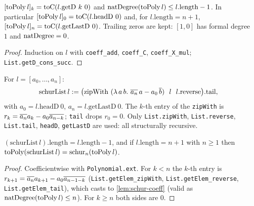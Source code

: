 \begin{lemma}\label{lem:toPoly-coeff}
$\coeff{\mathrm{toPoly}\,l}{k}=\mathrm{toC}(l.\mathrm{getD}\ k\ 0)$ and
$\mathrm{natDegree}(\mathrm{toPoly}\,l)\le l.\mathrm{length}-1$. In particular
$\coeff{\mathrm{toPoly}\,l}0=\mathrm{toC}(l.\mathrm{headD}\ 0)$ and, for
$l.\mathrm{length}=n+1$, $\coeff{\mathrm{toPoly}\,l}n=\mathrm{toC}(l.\mathrm{getLastD}\ 0)$.
Trailing zeros are kept: $[1,0]$ has formal degree $1$ and $\mathrm{natDegree}=0$.
\end{lemma}
\begin{proof}
Induction on $l$ with \texttt{coeff\_add}, \texttt{coeff\_C},
\texttt{coeff\_X\_mul}; \texttt{List.getD\_cons\_succ}.
\end{proof}

\begin{definition}\label{def:schurList}
For $l=[a_0,\ldots,a_n]$:
\[ \mathrm{schurList}\,l := \big(\mathrm{zipWith}\ (\lambda\,a\,b.\ \cj{a_n}\,a-a_0\,\cj b)\ \ l\ \ l.\mathrm{reverse}\big).\mathrm{tail}, \]
with $a_0=l.\mathrm{headD}\ 0$, $a_n=l.\mathrm{getLastD}\ 0$. The $k$-th entry of
the \texttt{zipWith} is $r_k=\overline{a_n}a_k-a_0\overline{a_{n-k}}$; \texttt{tail} drops
$r_0=0$. Only \texttt{List.zipWith}, \texttt{List.reverse}, \texttt{List.tail},
\texttt{headD}, \texttt{getLastD} are used: all structurally recursive.
\end{definition}

\begin{lemma}\label{lem:toPoly-schurList}
$(\mathrm{schurList}\,l).\mathrm{length}=l.\mathrm{length}-1$, and if
$l.\mathrm{length}=n+1$ with $n\ge1$ then
$\mathrm{toPoly}(\mathrm{schurList}\,l)=\mathrm{schur}_n(\mathrm{toPoly}\,l)$.
\end{lemma}
\begin{proof}
Coefficientwise with \texttt{Polynomial.ext}. For $k<n$ the $k$-th entry is
$r_{k+1}=\overline{a_n}a_{k+1}-a_0\overline{a_{n-1-k}}$ (\texttt{List.getElem\_zipWith},
\texttt{List.getElem\_reverse}, \texttt{List.getElem\_tail}), which casts to
\ref{lem:schur-coeff} (valid as $\mathrm{natDegree}(\mathrm{toPoly}\,l)\le n$). For
$k\ge n$ both sides are $0$.
\end{proof}


